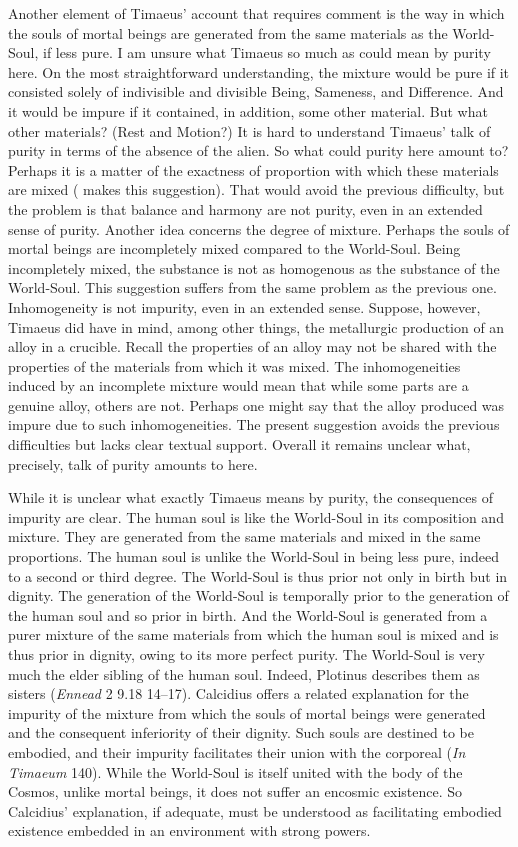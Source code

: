 Another element of Timaeus' account that requires comment is the way in which the souls of mortal beings are generated from the same materials as the World-Soul, if less pure. I am unsure what Timaeus so much as could mean by purity here. On the most straightforward understanding, the mixture would be pure if it consisted solely of indivisible and divisible Being, Sameness, and Difference. And it would be impure if it contained, in addition, some other material. But what other materials? (Rest and Motion?) It is hard to understand Timaeus' talk of purity in terms of the absence of the alien. So what could purity here amount to? Perhaps it is a matter of the exactness of proportion with which these materials are mixed (\citealt[141 n11]{Archer-Hind:1888qd} makes this suggestion). That would avoid the previous difficulty, but the problem is that balance and harmony are not purity, even in an extended sense of purity. Another idea concerns the degree of mixture. Perhaps the souls of mortal beings are incompletely mixed compared to the World-Soul. Being incompletely mixed, the substance is not as homogenous as the substance of the World-Soul. This suggestion suffers from the same problem as the previous one. Inhomogeneity is not impurity, even in an extended sense. Suppose, however, Timaeus did have in mind, among other things, the metallurgic production of an alloy in a crucible. Recall the properties of an alloy may not be shared with the properties of the materials from which it was mixed. The inhomogeneities induced by an incomplete mixture would mean that while some parts are a genuine alloy, others are not. Perhaps one might say that the alloy produced was impure due to such inhomogeneities. The present suggestion avoids the previous difficulties but lacks clear textual support. Overall it remains unclear what, precisely, talk of purity amounts to here.

While it is unclear what exactly Timaeus means by purity, the consequences of impurity are clear. The human soul is like the World-Soul in its composition and mixture. They are generated from the same materials and mixed in the same proportions. The human soul is unlike the World-Soul in being less pure, indeed to a second or third degree. The World-Soul is thus prior not only in birth but in dignity. The generation of the World-Soul is temporally prior to the generation of the human soul and so prior in birth. And the World-Soul is generated from a purer mixture of the same materials from which the human soul is mixed and is thus prior in dignity, owing to its more perfect purity. The World-Soul is very much the elder sibling of the human soul. Indeed, Plotinus describes them as sisters (\emph{Ennead} 2 9.18 14--17). Calcidius offers a related explanation for the impurity of the mixture from which the souls of mortal beings were generated and the consequent inferiority of their dignity. Such souls are destined to be embodied, and their impurity facilitates their union with the corporeal (\emph{In Timaeum} 140). While the World-Soul is itself united with the body of the Cosmos, unlike mortal beings, it does not suffer an encosmic existence. So Calcidius' explanation, if adequate, must be understood as facilitating embodied existence embedded in an environment with strong powers.

